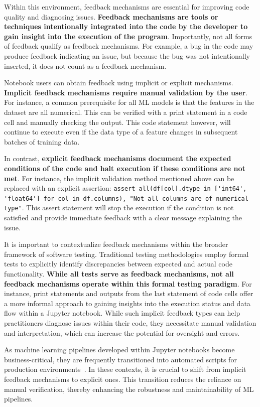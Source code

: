 \documentclass[journal]{IEEEtran}       %
\begin{document}
Within this environment, feedback mechanisms are essential for
improving code quality and diagnosing issues. \textbf{Feedback
  mechanisms are tools or techniques intentionally integrated into the
  code by the developer to gain insight into the execution of the
program}. Importantly, not all forms of feedback qualify as feedback
mechanisms. For example, a bug in the code may produce feedback
indicating an issue, but because the bug was not intentionally
inserted, it does not count as a feedback mechanism.

Notebook users can obtain feedback using implicit or explicit
mechanisms. \textbf{Implicit feedback mechanisms require manual
validation by the user}. For instance, a common prerequisite for all
ML models is that the features in the dataset are all numerical. This
can be verified with a print statement in a code cell and manually
checking the output. This code statement however, will continue to
execute even if the data type of a feature changes in subsequent
batches of training data.

In contrast, \textbf{explicit feedback mechanisms document the
  expected conditions of the code and halt execution if these
conditions are not met}. For instance, the implicit validation method
mentioned above can be replaced with an explicit assertion:
\lstinline{assert all(df[col].dtype in ['int64', 'float64'] for col in df.columns), "Not all columns are of numerical type"}.
This assert
statement will stop the execution if the condition is not satisfied
and provide immediate feedback with a clear message explaining the issue.

It is important to contextualize feedback mechanisms within the
broader framework of software testing. Traditional testing
methodologies employ formal tests to explicitly identify
discrepancies between expected and actual code functionality.
\textbf{While all tests serve as feedback mechanisms, not all
feedback mechanisms operate within this formal testing paradigm}. For
instance, print statements and outputs from the last statement of
code cells offer a more informal approach to gaining insights into
the execution status and data flow within a Jupyter notebook. While
such implicit feedback types can help practitioners diagnose issues
within their code, they necessitate manual validation and
interpretation, which can increase the potential for oversight and errors.

As machine learning pipelines developed within Jupyter notebooks
become business-critical, they are frequently transitioned into
automated scripts for production
environments~\cite{kery2018story,rule2018exploration}. In these
contexts, it is crucial to shift from implicit feedback mechanisms to
explicit ones. This transition reduces the reliance on manual
verification, thereby enhancing the robustness and maintainability of
ML pipelines.
\end{document}
